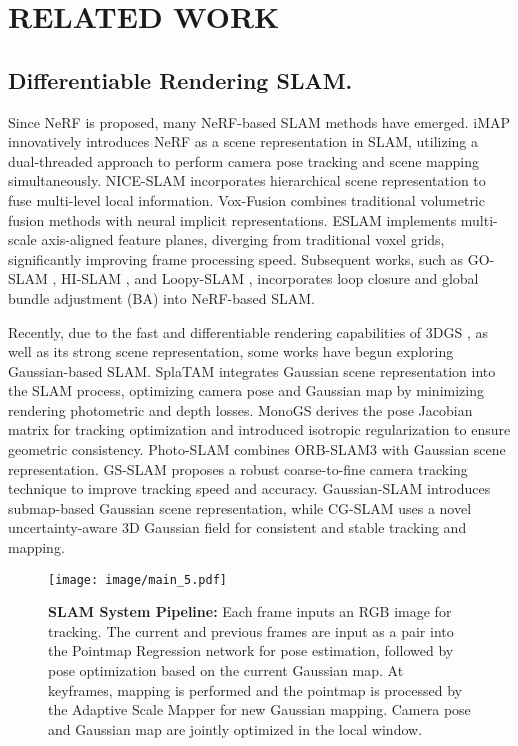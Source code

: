 \section{RELATED WORK}
\subsection{Differentiable Rendering SLAM.} 
Since NeRF \cite{yen2021inerf} is proposed, many NeRF-based SLAM methods have emerged. iMAP \cite{sucar2021imap} innovatively introduces NeRF as a scene representation in SLAM, utilizing a dual-threaded approach to perform camera pose tracking and scene mapping simultaneously. NICE-SLAM \cite{zhu2022niceslam} incorporates hierarchical scene representation to fuse multi-level local information. Vox-Fusion \cite{yang2022voxfusion} combines traditional volumetric fusion methods with neural implicit representations. ESLAM \cite{johari2023eslam} implements multi-scale axis-aligned feature planes, diverging from traditional voxel grids, significantly improving frame processing speed. Subsequent works, such as GO-SLAM \cite{zhang2023goslam}, HI-SLAM \cite{zhang2023hislam}, and Loopy-SLAM \cite{liso2024loopyslam}, incorporates loop closure and global bundle adjustment (BA) into NeRF-based SLAM.

Recently, due to the fast and differentiable rendering capabilities of 3DGS \cite{kerbl20233dgs}, as well as its strong scene representation, some works have begun exploring Gaussian-based SLAM. SplaTAM \cite{keetha2024splatam} integrates Gaussian scene representation into the SLAM process, optimizing camera pose and Gaussian map by minimizing rendering photometric and depth losses. MonoGS \cite{matsuki2024gaussianmonogs} derives the pose Jacobian matrix for tracking optimization and introduced isotropic regularization to ensure geometric consistency. Photo-SLAM \cite{huang2024photo} combines ORB-SLAM3 \cite{campos2021orb-slam3} with Gaussian scene representation. GS-SLAM \cite{yan2024gs-slam} proposes a robust coarse-to-fine camera tracking technique to improve tracking speed and accuracy. Gaussian-SLAM \cite{yugay2023gaussianslam} introduces submap-based Gaussian scene representation, while CG-SLAM \cite{hu2024cg-slam} uses a novel uncertainty-aware 3D Gaussian field for consistent and stable tracking and mapping.

\begin{figure*}
    \centering
    \texttt{[image: image/main\_5.pdf]}
    \caption{\textbf{SLAM System Pipeline:} Each frame inputs an RGB image for tracking. The current and previous frames are input as a pair into the Pointmap Regression network for pose estimation, followed by pose optimization based on the current Gaussian map. At keyframes, mapping is performed and the pointmap is processed by the Adaptive Scale Mapper for new Gaussian mapping. Camera pose and Gaussian map are jointly optimized in the local window.}
    \label{main}
\vspace{-15pt}
\end{figure*}

